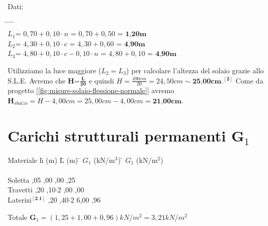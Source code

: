 \documentclass[a4paper,12pt, oneside]{book}
\begin{document}
	Dati:
	\begin{tabbing}
		\hspace{14em} \= \hspace{2em} \= \hspace{6em} \= \hspace{2em} \= \hspace{2em} \\ 
		$L_1$=  $0,70+0,10\cdot n$              \> = \> $0,70+0,50$ \> = \> $\textbf{1,20m}$  \\
		$L_2$=  $4,30+0,10\cdot c$              \> = \> $4,30+0,60$ \> = \> $\textbf{4,90m}$  \\
		$L_3$=  $4,80+0,10\cdot c-0,10\cdot n$  \> = \> $4,80+0,10$ \> = \> $\textbf{4,90m}$                     
	\end{tabbing}	
	\leavevmode\newline
	Utilizziamo la luce maggiore ($L_2=L_3$) per calcolare l'altezza del solaio grazie allo S.L.E. Avremo che $\textbf{H=}\frac{\textbf{L}}{\textbf{20}}$ e quindi $H=\frac{490cm}{20}=24,50cm\sim\textbf{25,00cm}$.$^{[\textbf{2}]}$\label{2}
    \leavevmode\newline
    \leavevmode\newline
	Come da progetto [\ref{fig:misure-solaio-flessione-normale}] avremo $\textbf{H}_{sbalzo}=H-4,00cm=25,00cm-4,00cm=\textbf{21,00cm}$.
	
	\section{Carichi strutturali permanenti $\textbf{G}_1$}
	
	\begin{tabbing}
		Materiale\hspace{2em} \= h (m)\hspace{3em} \= L (m)\hspace{3em} \= $G_1$ (kN/m$^3$)\hspace{3em} \= $G_1$ (kN/m$^2$)\hspace{1em}\\\\
		Soletta  ,05 ,00           ,00           ,25  \\
		Travetti \> 0,20 ,10$\cdot$2   ,00           ,00  \\ 
		Laterizi$^{[\textbf{2.1}]}$\label{3} \> 0,20 ,40$\cdot$2 \> \phantom{0}6,00 ,96                                    
	\end{tabbing}	    
	
	Totale $\textbf{G}_1=(1,25+1,00+0,96)kN/m^2=3,21kN/m^2$ 
\end{document}
